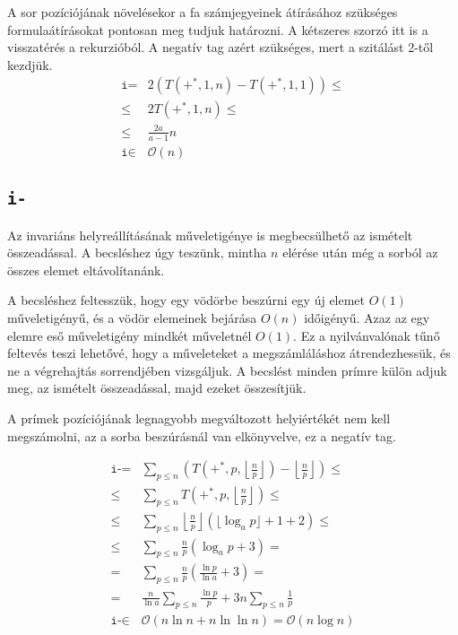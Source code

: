 \documentclass{article}
\begin{document}
A sor pozíciójának növelésekor a fa számjegyeinek átírásához szükséges formulaátírásokat pontosan meg tudjuk határozni.
A kétszeres szorzó itt is a visszatérés a rekurzióból.
A negatív tag azért szükséges, mert a szitálást 2-től kezdjük.
\begin{align*}
\texttt{i} =& 2 \left( T(+^*, 1, n) - T(+^*, 1, 1) \right) \le \\
\le& 2 T(+^*, 1, n) \le \\
\le& \frac{2a}{a-1} n \\
\texttt{i} \in& \mathcal{O}(n)
\end{align*}

\subsection{\texttt{i-}}

Az invariáns helyreállításának műveletigénye is megbecsülhető az ismételt összeadással. A becsléshez úgy teszünk, mintha $n$ elérése után még a sorból az összes elemet eltávolítanánk.

A becsléshez feltesszük, hogy egy vödörbe beszúrni egy új elemet $O(1)$ műveletigényű, és a vödör elemeinek bejárása $O(n)$ időigényű.
Azaz az egy elemre eső műveletigény mindkét műveletnél $O(1)$.
Ez a nyilvánvalónak tűnő feltevés teszi lehetővé, hogy a műveleteket a megszámláláshoz átrendezhessük, és ne a végrehajtás sorrendjében vizsgáljuk.
A becslést minden prímre külön adjuk meg, az ismételt összeadással, majd ezeket összesítjük.

A prímek pozíciójának legnagyobb megváltozott helyiértékét nem kell megszámolni, az a sorba beszúrásnál van elkönyvelve, ez a negatív tag.

\begin{align*}
\texttt{i-} =& \sum_{p \le n} \left( T(+^*, p, \left\lfloor \frac{n}{p} \right\rfloor ) - \left\lfloor \frac{n}{p} \right\rfloor \right) \le \\
\le& \sum_{p \le n} T(+^*, p, \left\lfloor \frac{n}{p} \right\rfloor ) \le \\
\le& \sum_{p \le n} \left\lfloor \frac{n}{p} \right\rfloor \left( \lfloor \log_{a}{p} \rfloor + 1 + 2 \right) \le \\
\le& \sum_{p \le n} \frac{n}{p} \left( \log_{a}{p} + 3 \right) = \\
=& \sum_{p \le n} \frac{n}{p} \left( \frac{\ln{p}}{\ln{a}} + 3 \right) = \\
=& \frac{n}{\ln{a}} \sum_{p \le n} \frac{\ln{p}}{p} + 3n \sum_{p \le n} \frac{1}{p} \\
\texttt{i-} \in& \mathcal{O}(n \ln{n} + n \ln{\ln{n}}) = \mathcal{O}(n \log{n})
\end{align*}
\end{document}
